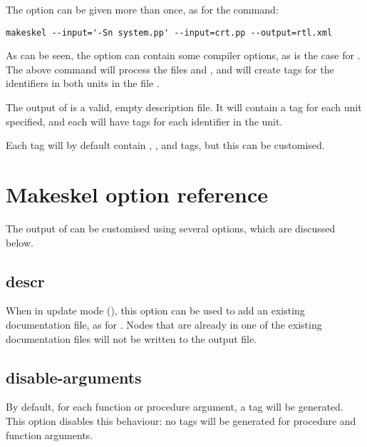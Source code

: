 The  option can be given more than once, as for the 
command:
\begin{verbatim}
makeskel --input='-Sn system.pp' --input=crt.pp --output=rtl.xml
\end{verbatim}
As can be seen, the  option can contain some compiler options,
as is the case for \fpdoc. The above command will process the files
 and , and will create  tags 
for the identifiers in both units in the file .

The output of  is a valid, empty description file. It will
contain a  tag for each unit specified, and each 
will have  tags for each identifier in the unit. 

Each  tag will by default contain , ,
 and  tags, but this can be customised.

\section{Makeskel option reference}
\label{se:makeskeloption}
The output of  can be customised using several options, which
are discussed below.

\subsection{descr}
When in update mode (), this option can be used to add an
existing documentation file, as for . Nodes that are already 
in one of the existing documentation files will not be written to the 
output file.

\subsection{disable-arguments}
\label{suse:msdisablearguments}
By default, for each function or procedure argument, a  tag will
be generated. This option disables this behaviour: no  tags
will be generated for procedure and function arguments.

